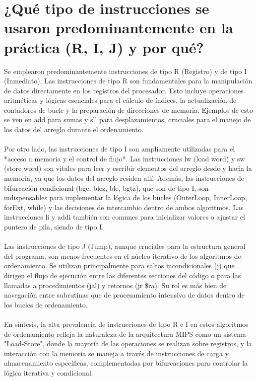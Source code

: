 \documentclass{article}
\begin{document}
\section{¿Qué tipo de instrucciones se usaron predominantemente en la práctica (R, I, J) y por qué?}
Se emplearon predominantemente instrucciones de tipo R (Registro) y de tipo I (Inmediato). Las instrucciones de tipo R son fundamentales para la manipulación de datos directamente en los registros del procesador. Esto incluye operaciones aritméticas y lógicas esenciales para el cálculo de índices, la actualización de contadores de bucle y la preparación de direcciones de memoria. Ejemplos de esto se ven en add para sumas y sll para desplazamientos, cruciales para el manejo de los datos del arreglo durante el ordenamiento.
\\
\\Por otro lado, las instrucciones de tipo I son ampliamente utilizadas para el *acceso a memoria y el control de flujo*. Las instrucciones lw (load word) y sw (store word) son vitales para leer y escribir elementos del arreglo desde y hacia la memoria, ya que los datos del arreglo residen allí. Además, las instrucciones de bifurcación condicional (bge, blez, ble, bgtz), que son de tipo I, son indispensables para implementar la lógica de los bucles (OuterLoop, InnerLoop, forExt, while) y las decisiones de intercambio dentro de ambos algoritmos. Las instrucciones li y addi también son comunes para inicializar valores o ajustar el puntero de pila, siendo de tipo I.
\\
\\Las instrucciones de tipo J (Jump), aunque cruciales para la estructura general del programa, son menos frecuentes en el núcleo iterativo de los algoritmos de ordenamiento. Se utilizan principalmente para saltos incondicionales (j) que dirigen el flujo de ejecución entre las diferentes secciones del código o para las llamadas a procedimientos (jal) y retornos (jr \$ra). Su rol es más bien de navegación entre subrutinas que de procesamiento intensivo de datos dentro de los bucles de ordenamiento.
\\
\\En síntesis, la alta prevalencia de instrucciones de tipo R e I en estos algoritmos de ordenamiento refleja la naturaleza de la arquitectura MIPS como un sistema "Load-Store", donde la mayoría de las operaciones se realizan sobre registros, y la interacción con la memoria se maneja a través de instrucciones de carga y almacenamiento específicas, complementadas por bifurcaciones para controlar la lógica iterativa y condicional.
\end{document}
